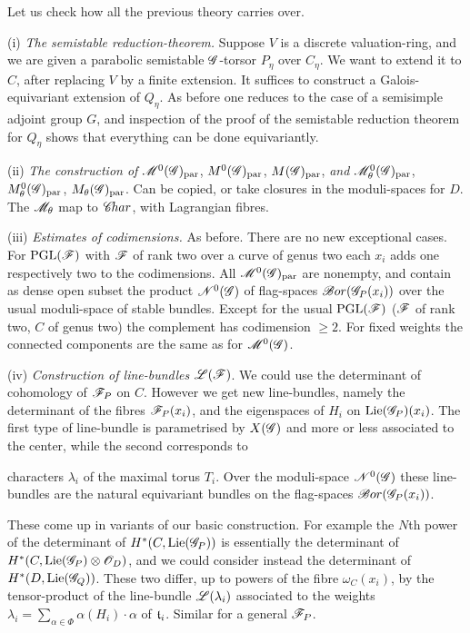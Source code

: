 \documentclass[12pt,english]{smfart}
\theoremstyle{plain} \newtheorem{innerthm}{Theorem} \newtheorem{innerlem}{Lemma} \newtheorem{innerprop}{Proposition} \newtheorem{innercor}{Corollary} \theoremstyle{definition} \newtheorem{innerdefn}{Definition} \newtheorem{innerconstr}{Construction} \theoremstyle{remark} \newtheorem*{remark}{Remark} \newtheorem*{remarks}{Remarks} \newtheorem*{applications}{Applications}
\begin{document}
Let us check how all the previous theory carries over.

(i) \textit{The semistable reduction-theorem.} Suppose $V$ is a discrete valuation-ring, and we are given a parabolic semistable $\mathscr{G}$-torsor $P_\eta$ over $C_\eta$. We want to extend it to $C$, after replacing $V$ by a finite extension. It suffices to construct a Galois-equivariant extension of $Q_\eta$. As before one reduces to the case of a semisimple adjoint group $G$, and inspection of the proof of the semistable reduction theorem for $Q_\eta$ shows that everything can be done equivariantly.

(ii) \textit{The construction of} $\mathscr{M}^0(\mathscr{G})_{\mathrm{par}}$, $M^0(\mathscr{G})_{\mathrm{par}}$, $M(\mathscr{G})_{\mathrm{par}}$, \textit{and} $\mathscr{M}^0_\theta(\mathscr{G})_{\mathrm{par}}$, $M^0_\theta(\mathscr{G})_{\mathrm{par}}$, $M_\theta(\mathscr{G})_{\mathrm{par}}$. Can be copied, or take closures in the moduli-spaces for $D$. The $\mathscr{M}_\theta$ map to $\mathscr{C}\!har$, with Lagrangian fibres.

(iii) \textit{Estimates of codimensions.} As before. There are no new exceptional cases. For $\mathrm{PGL}(\mathscr{F})$ with $\mathscr{F}$ of rank two over a curve of genus two each $x_i$ adds one respectively two to the codimensions. All $\mathscr{M}^0(\mathscr{G})_{\mathrm{par}}$ are nonempty, and contain as dense open subset the product $\mathscr{N}^0(\mathscr{G})$ of flag-spaces $\mathscr{B}or(\mathscr{G}_P(x_i))$ over the usual moduli-space of stable bundles. Except for the usual $\mathrm{PGL}(\mathscr{F})$ ($\mathscr{F}$ of rank two, $C$ of genus two) the complement has codimension $\ge 2$. For fixed weights the connected components are the same as for $\mathscr{M}^0(\mathscr{G})$.

(iv) \textit{Construction of line-bundles} $\mathscr{L}(\mathscr{F})$. We could use the determinant of cohomology of $\mathscr{F}_P$ on $C$. However we get new line-bundles, namely the determinant of the fibres $\mathscr{F}_P(x_i)$, and the eigenspaces of $H_i$ on $\operatorname{Lie}(\mathscr{G}_P)(x_i)$. The first type of line-bundle is parametrised by $X(\mathscr{G})$ and more or less associated to the center, while the second corresponds to


characters $\lambda_i$ of the maximal torus $T_i$. Over the moduli-space $\mathscr{N}^0(\mathscr{G})$ these line-bundles are the natural equivariant bundles on the flag-spaces $\mathscr{B}or(\mathscr{G}_P(x_i))$.

These come up in variants of our basic construction. For example the $N$th power of the determinant of $H^*(C,\operatorname{Lie}(\mathscr{G}_P))$ is essentially the determinant of $H^*(C,\operatorname{Lie}(\mathscr{G}_P)\otimes\mathscr{O}_D)$, and we could consider instead the determinant of $H^*(D,\operatorname{Lie}(\mathscr{G}_Q))$. These two differ, up to powers of the fibre $\omega_C(x_i)$, by the tensor-product of the line-bundle $\mathscr{L}(\lambda_i)$ associated to the weights $\lambda_i=\sum_{\alpha\in\Phi}\alpha(H_i)\cdot\alpha$ of $\mathfrak{t}_i$. Similar for a general $\mathscr{F}_P$.
\end{document}
